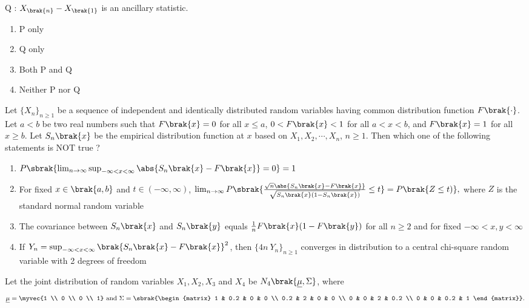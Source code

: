 Q : $X_{\brak{n}} - X_{\brak{1}}$ is an ancillary statistic.
\begin{enumerate}
    \item P only
    \item Q only
    \item Both P and Q
    \item Neither P nor Q \\ 
\end{enumerate}
\item Let $\{X_n\}_{n \geq 1}$ be a sequence of independent and identically distributed random variables having common distribution function $ F\brak{\cdot}$. Let $a < b$ be two real numbers such that $F\brak{x} = 0$ for all $x \leq a$, $0 < F\brak{x} < 1$ for all $a < x < b$, and $F\brak{x} = 1$ for all $x \geq b$. Let $S_n\brak{x}$ be the empirical distribution function at $x$ based on $X_1, X_2, \cdots, X_n$, $n \geq 1$. Then which one of the following statements is NOT true ?
\begin{enumerate}
    \item $P\sbrak{\lim_{n \rightarrow \infty} \sup_{-\infty < x < \infty} \abs{S_n\brak{x} - F\brak{x}} = 0} = 1$
    \item For fixed $x \in \brak{a, b}$ and $t \in (-\infty, \infty)$,
    $\lim_{n \to \infty} P\sbrak{\frac{\sqrt{n}\abs{S_n\brak{x} - F\brak{x}}}{\sqrt{S_n\brak{x}(1 - S_n\brak{x})}} \leq t} = P\brak{Z \leq t)},$
    where $Z$ is the standard normal random variable
    \item The covariance between $S_n\brak{x}$ and $S_n\brak{y}$ equals $\frac{1}{n} F\brak{x}(1 - F\brak{y})$ for all $n \geq 2$ and for fixed $-\infty < x, y < \infty$
    \item If $Y_n = \sup_{-\infty < x < \infty} \brak{S_n\brak{x} - F\brak{x}}^2$, then $\{4n\ Y_n\}_{n \geq 1}$ converges in distribution to a central chi-square random variable with 2 degrees of freedom \\
\end{enumerate}
\item Let the joint distribution of random variables $X_1, X_2, X_3$ and $X_4$ be $N_4\brak{\underline{\mu}, \Sigma}$, where
\begin{align*}
\underline{\mu} = \myvec{1 \\ 0 \\ 0 \\ 1}\ \text{and}\ \Sigma = \sbrak{\begin{matrix}
    1 & 0.2 & 0 & 0 \\ 0.2 & 2 & 0 & 0 \\ 0 & 0 & 2 & 0.2 \\ 0 & 0 & 0.2 & 1
\end{matrix}}.
\end{align*}
